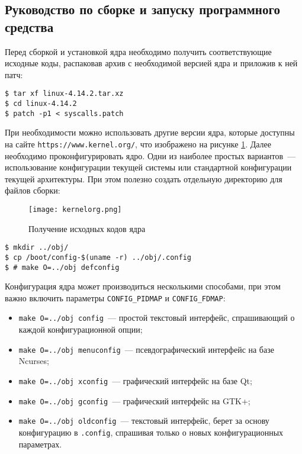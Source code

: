 \subsection{Руководство по сборке и запуску программного средства}

Перед сборкой и установкой ядра необходимо получить соответствующие исходные
коды, распаковав архив с необходимой версией ядра и приложив к ней патч:

\medskip
\begin{lstlisting}[style=cstyle]
$ tar xf linux-4.14.2.tar.xz
$ cd linux-4.14.2
$ patch -p1 < syscalls.patch
\end{lstlisting}
\medskip

При необходимости можно использовать другие версии ядра, которые доступны на
сайте \texttt{https://www.kernel.org/}, что изображено на рисунке
\ref{fig:kernelorg}. Далее необходимо проконфигурировать
ядро. Одни из наиболее простых вариантов~--- использование конфигурации текущей
системы или стандартной конфигурации текущей архитектуры. При этом полезно
создать отдельную директорию для файлов сборки:

\begin{figure}
  \centering
  \texttt{[image: kernelorg.png]}
  \caption{Получение исходных кодов ядра}
  \label{fig:kernelorg}
\end{figure}

\medskip
\begin{lstlisting}[style=cstyle]
$ mkdir ../obj/
$ cp /boot/config-$(uname -r) ../obj/.config
$ # make O=../obj defconfig
\end{lstlisting}
\medskip

Конфигурация ядра может производиться несколькими способами, при этом важно
включить параметры \texttt{CONFIG\_PIDMAP} и \texttt{CONFIG\_FDMAP}:
\begin{itemize}
\item \texttt{make O=../obj config}~--- простой текстовый интерфейс,
  спрашивающий о каждой конфигурационной опции;
\item \texttt{make O=../obj menuconfig}~--- псевдографический интерфейс на базе
  Ncurses;
\item \texttt{make O=../obj xconfig}~--- графический интерфейс на базе Qt;
\item \texttt{make O=../obj gconfig}~--- графический интерфейс на GTK+;
\item \texttt{make O=../obj oldconfig}~--- текстовый интерфейс, берет за основу
  конфигурацию в \texttt{.config}, спрашивая только о новых конфигурационных
  параметрах.
\end{itemize}

